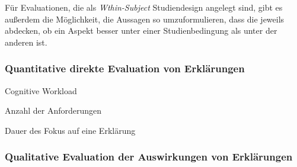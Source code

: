 Für Evaluationen, die als \textit{Wthin-Subject} Studiendesign angelegt sind, gibt es außerdem die Möglichkeit, die Aussagen so umzuformulieren, dass die jeweils abdecken, ob ein Aspekt besser unter einer Studienbedingung als unter der anderen ist.

\subsubsection{Quantitative direkte Evaluation von Erklärungen}

Cognitive Workload \cite{wiegand2019drive}

Anzahl der Anforderungen

Dauer des Fokus auf eine Erklärung

\subsubsection{Qualitative Evaluation der Auswirkungen von Erklärungen}

